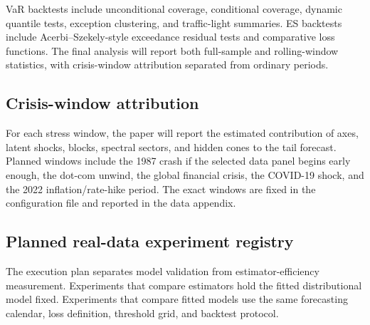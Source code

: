 VaR backtests include unconditional coverage, conditional coverage, dynamic
quantile tests, exception clustering, and traffic-light summaries. ES
backtests include Acerbi--Szekely-style exceedance residual tests and
comparative loss functions. The final analysis will report both full-sample
and rolling-window statistics, with crisis-window attribution separated from
ordinary periods.

\begin{table}[p]
\centering

\caption[VaR and ES backtest]{VaR and ES
backtest results. Values are \xx{} placeholders. The final table will compare
independent, latent-shock, block, copula, spectral, historical, and
parametric benchmarks across exception rate, independence, conditional
coverage, ES residual, and comparative scoring metrics.}
\label{tab:var-es-backtest-placeholder}
\end{table}

\subsection{Crisis-window attribution}

For each stress window, the paper will report the estimated contribution of
axes, latent shocks, blocks, spectral sectors, and hidden cones to the tail
forecast. Planned windows include the 1987 crash if the selected data panel
begins early enough, the dot-com unwind, the global financial crisis, the
COVID-19 shock, and the 2022 inflation/rate-hike period. The exact windows
are fixed in the configuration file and reported in the data appendix.

\begin{table}[p]
\centering

\caption[Crisis attribution]{Crisis-window
tail attribution. Values are \xx{} placeholders. The final table will
decompose forecast tail probability into marginal axes, latent common shocks,
blocks, spectral sectors, and hidden cones by stress period.}
\label{tab:crisis-attribution-placeholder}
\end{table}


\subsection{Planned real-data experiment registry}

The execution plan separates model validation from estimator-efficiency
measurement. Experiments that compare estimators hold the fitted distributional
model fixed. Experiments that compare fitted models use the same forecasting
calendar, loss definition, threshold grid, and backtest protocol.

